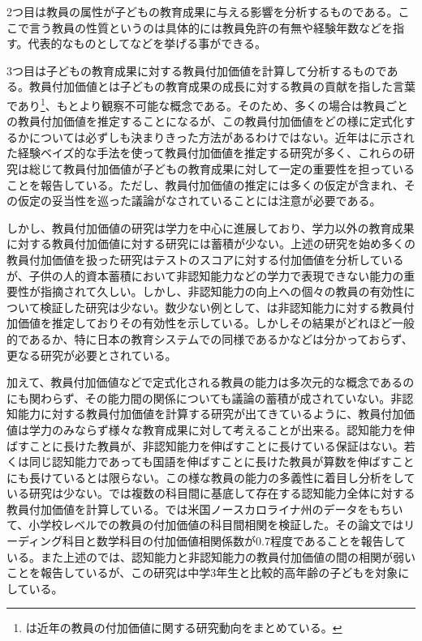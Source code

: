 \documentclass[a4paper,12pt]{article}
\begin{document}
2つ目は教員の属性が子どもの教育成果に与える影響を分析するものである。ここで言う教員の性質というのは具体的には教員免許の有無や経験年数などを指す。代表的なものとして\cite{Jackson2009aejae,clotfelter2010teacher}などを挙げる事ができる。

3つ目は子どもの教育成果に対する教員付加価値を計算して分析するものである。教員付加価値とは子どもの教育成果の成長に対する教員の貢献を指した言葉であり\footnote{\cite{jackson2014teacher}は近年の教員の付加価値に関する研究動向をまとめている。}、もとより観察不可能な概念である。そのため、多くの場合は教員ごとの教員付加価値を推定することになるが、この教員付加価値をどの様に定式化するかについては必ずしも決まりきった方法があるわけではない。近年は\cite{kane2008estimating}に示された経験ベイズ的な手法を使って教員付加価値を推定する研究が多く\cite{chetty, lefgun}、これらの研究は総じて教員付加価値が子どもの教育成果に対して一定の重要性を担っていることを報告している。ただし、教員付加価値の推定には多くの仮定が含まれ、その仮定の妥当性を巡った議論がなされていることには注意が必要である\citep{rothstein, kinsler}。

しかし、教員付加価値の研究は学力を中心に進展しており、学力以外の教育成果に対する教員付加価値に対する研究には蓄積が少ない。上述の研究を始め多くの教員付加価値を扱った研究はテストのスコアに対する付加価値を分析しているが、子供の人的資本蓄積において非認知能力などの学力で表現できない能力の重要性が指摘されて久しい。しかし、非認知能力の向上への個々の教員の有効性について検証した研究は少ない。数少ない例として、\cite{jackson}は非認知能力に対する教員付加価値を推定しておりその有効性を示している。しかしその結果がどれほど一般的であるか、特に日本の教育システムでの同様であるかなどは分かっておらず、更なる研究が必要とされている。

加えて、教員付加価値などで定式化される教員の能力は多次元的な概念であるのにも関わらず、その能力間の関係についても議論の蓄積が成されていない。非認知能力に対する教員付加価値を計算する研究が出てきているように、教員付加価値は学力のみならず様々な教育成果に対して考えることが出来る。認知能力を伸ばすことに長けた教員が、非認知能力を伸ばすことに長けている保証はない。若くは同じ認知能力であっても国語を伸ばすことに長けた教員が算数を伸ばすことにも長けているとは限らない。この様な教員の能力の多義性に着目し分析をしている研究は少ない。\cite{lefgun}では複数の科目間に基底して存在する認知能力全体に対する教員付加価値を計算している。\cite{goldhaber2013good}では米国ノースカロライナ州のデータをもちいて、小学校レベルでの教員の付加価値の科目間相関を検証した。その論文ではリーディング科目と数学科目の付加価値相関係数が0.7程度であることを報告している。また上述の\cite{jackson}では、認知能力と非認知能力の教員付加価値の間の相関が弱いことを報告しているが、この研究は中学3年生と比較的高年齢の子どもを対象にしている。
\end{document}
